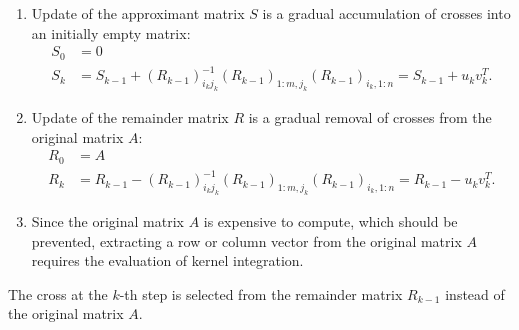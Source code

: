 \documentclass[11pt, a4paper]{book}
\begin{document}
\begin{enumerate}
\item Update of the approximant matrix $S$ is a gradual accumulation of crosses into an initially empty matrix:
  \begin{equation*}
    \begin{split} S_0 &= 0 \\ S_{k} &= S_{k-1}+(R_{k-1})_{i_k
        j_k}^{-1}(R_{k-1})_{1:m,j_k}(R_{k-1})_{i_k,1:n} = S_{k-1} + u_kv_k^T.
    \end{split}
  \end{equation*}
\item Update of the remainder matrix $R$ is a gradual removal of crosses from the original matrix $A$:
  \begin{equation*}
    \begin{split} R_0 &= A \\ R_{k} &= R_{k-1}-(R_{k-1})_{i_k
        j_k}^{-1}(R_{k-1})_{1:m,j_k}(R_{k-1})_{i_k,1:n} = R_{k-1}-u_kv_k^T.
    \end{split}
  \end{equation*}
\item Since the original matrix $A$ is expensive to compute, which should be prevented, extracting a row or column vector from the original matrix $A$ requires the evaluation of kernel integration.
\end{enumerate}

\begin{remark} The cross at the $k$-th step is selected from the remainder matrix $R_{k-1}$ instead of the original matrix $A$.
\end{remark}
\end{document}
